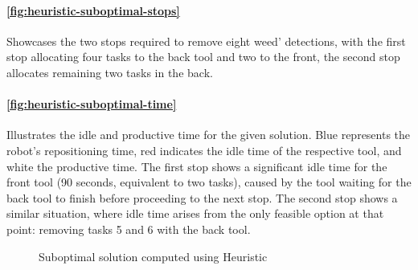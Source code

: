 \paragraph{\autoref{fig:heuristic-suboptimal-stops}} Showcases the two stops required to remove eight weed' detections, with the first stop allocating four tasks to the back tool and two to the front, the second stop allocates remaining two tasks in the back.

\paragraph{\autoref{fig:heuristic-suboptimal-time}} Illustrates the idle and productive time for the given solution. Blue represents the robot’s repositioning time, red indicates the idle time of the respective tool, and white the productive time. The first stop shows a significant idle time for the front tool (90 seconds, equivalent to two tasks), caused by the tool waiting for the back tool to finish before proceeding to the next stop. The second stop shows a similar situation, where idle time arises from the only feasible option at that point: removing tasks 5 and 6 with the back tool.

\begin{figure}[htb]
    \myfloatalign


    \caption{Suboptimal solution computed using Heuristic}
    \label{fig:heuristics-suboptimal}
\end{figure}

